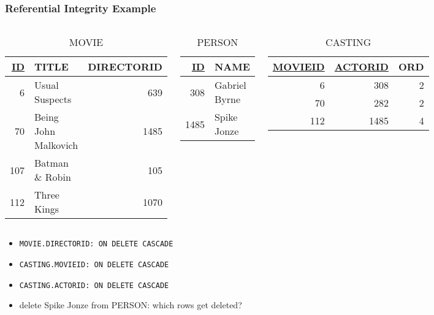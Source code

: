 \documentclass[dvipsnames]{beamer}
\theoremstyle{plain}
\begin{document}
\begin{frame}
  \frametitle{Referential Integrity Example}

  \begin{columns}[t]
    \begin{tiny}
    \begin{table}
      \caption{MOVIE}
      \begin{tabular}{|r|l|r|}\hline
\underline{ID} & TITLE             & DIRECTORID\\[2pt]\hline\hline
          6 & Usual Suspects       &        639\\\hline
         70 & Being John Malkovich &       1485\\\hline
        107 & Batman \& Robin      &        105\\\hline
        112 & Three Kings          &       1070\\\hline
      \end{tabular}
    \end{table}
    \end{tiny}

    \begin{tiny}
    \begin{table}
      \caption{PERSON}
      \begin{tabular}{|r|l|}\hline
\underline{ID} & NAME\\[2pt]\hline\hline
           308 & Gabriel Byrne\\\hline
          1485 & Spike Jonze  \\\hline
      \end{tabular}
    \end{table}
    \end{tiny}

    \begin{tiny}
    \begin{table}
      \caption{CASTING}
      \begin{tabular}{|r|r|r|}\hline
\underline{MOVIEID} & \underline{ACTORID} & ORD\\[2pt]\hline\hline
                  6 &                 308 &   2\\\hline
                 70 &                 282 &   2\\\hline
                112 &                1485 &   4\\\hline
      \end{tabular}
    \end{table}
    \end{tiny}
  \end{columns}

  \begin{itemize}
    \item \lstinline!MOVIE.DIRECTORID: ON DELETE CASCADE!
    \item \lstinline!CASTING.MOVIEID: ON DELETE CASCADE!
    \item \lstinline!CASTING.ACTORID: ON DELETE CASCADE!
    \smallskip
    \item delete Spike Jonze from PERSON: which rows get deleted?
  \end{itemize}
\end{frame}
\end{document}

